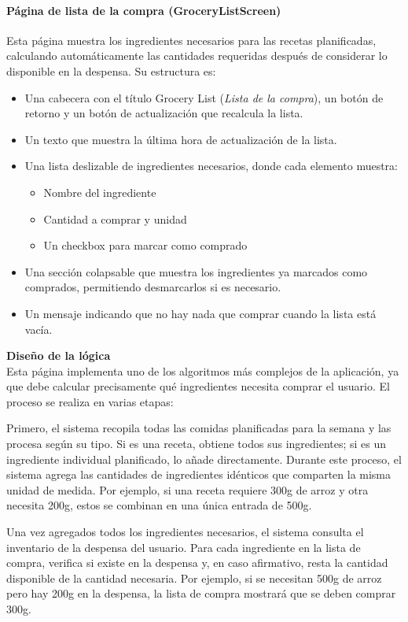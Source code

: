 \documentclass[twoside, openright, 11pt]{report}
\begin{document}
				\paragraph{Página de lista de la compra (GroceryListScreen)}
				Esta página muestra los ingredientes necesarios para las recetas planificadas, calculando automáticamente las cantidades requeridas después de considerar lo disponible en la despensa. Su estructura es:
				
				\begin{itemize}
					\item Una cabecera con el título Grocery List (\textit{Lista de la compra}), un botón de retorno y un botón de actualización que recalcula la lista.
					\item Un texto que muestra la última hora de actualización de la lista.
					\item Una lista deslizable de ingredientes necesarios, donde cada elemento muestra:
					\begin{itemize}
						\item Nombre del ingrediente
						\item Cantidad a comprar y unidad
						\item Un checkbox para marcar como comprado
					\end{itemize}
					\item Una sección colapsable que muestra los ingredientes ya marcados como comprados, permitiendo desmarcarlos si es necesario.
					\item Un mensaje indicando que no hay nada que comprar cuando la lista está vacía.
				\end{itemize}
				
				\textbf{Diseño de la lógica}\\
				Esta página implementa uno de los algoritmos más complejos de la aplicación, ya que debe calcular precisamente qué ingredientes necesita comprar el usuario. El proceso se realiza en varias etapas:
				
				Primero, el sistema recopila todas las comidas planificadas para la semana y las procesa según su tipo. Si es una receta, obtiene todos sus ingredientes; si es un ingrediente individual planificado, lo añade directamente. Durante este proceso, el sistema agrega las cantidades de ingredientes idénticos que comparten la misma unidad de medida. Por ejemplo, si una receta requiere 300g de arroz y otra necesita 200g, estos se combinan en una única entrada de 500g.
				
				Una vez agregados todos los ingredientes necesarios, el sistema consulta el inventario de la despensa del usuario. Para cada ingrediente en la lista de compra, verifica si existe en la despensa y, en caso afirmativo, resta la cantidad disponible de la cantidad necesaria. Por ejemplo, si se necesitan 500g de arroz pero hay 200g en la despensa, la lista de compra mostrará que se deben comprar 300g.
				
\end{document}

